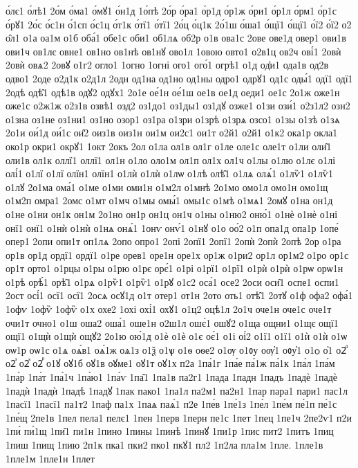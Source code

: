 {о́лє1
о́лѣ1
2о́м
о́ма1
о́мꙋ1
о́н1д
1о́пѣ
2о́р
о́ра1
о́р1д
о́р1ж
о́ри1
о́р1л
о́рм1
о́р1с
о́рꙋ1
2о́с
о́с1н
о́1сп
о́с1ц
о́т1к
о́тї1
о́тї1
2о́ц
о́ц1к
2о́1ш
о́ша1
о́щї1
о́щї1
о́ї2
о́ї2
о2̑
о̑л1
о1а
оа1м
о1б
оба́1
обе1с
оби1
об1лѧ
об2р
о1в
ова1с
2ове
ове1д
овер1
ови1в
ови1ч
ов1лє
овне1
ов1но
ов1нѣ
ов1нꙋ
ово1л
1овою
овто1
о2в1ц
ов2ч
ові́1
2овѝ
2овѝ
овѧ2
2овꙋ
о1г2
огло1
1огно
1огні
ого1
ого́1
огрѣ1
о1д
од̾и1
ода1в
од2в
одво1
2оде
о2д1к
о2д1л
2одн
од1на
од1но
од1ны
одро1
одрꙋ1
од1с
оды́1
одї1
одї1
2одѣ
одѣ̑1
одѣ1в
одꙋ2
одꙋх1
2о1е
ое́1н
ое́1ш
ое1в
ое1д
оеди1
ое1с
2о1ж
оже1н
оже1с
о2ж1ж
о2з1в
озвѣ1
озд2
оз1до1
оз1ды1
оз1дꙋ
озже1
о1зи
ози́1
о2з1л2
озн2
о1зна
оз1не
оз1ни1
оз1но
озор1
оз1ра
о1зри
о1зрѣ
о1зрѧ
озсо1
о1зы
о1зѣ
о1зѧ
2о1и
ои́1д
ои́1с
ои̑2
оиз1в
оиз1н
ои1м
ои2с1
ои1т
о2й1
о2й1
о1к2
ока1р
окла1
око1р
окри1
окрꙋ1
1окт
2окъ
2ол
о1ла
ол1в
ол1г
о1ле
оле1с
оле1т
о1ли
оли̑1
оли1в
ол1к
оллї1
оллї1
ол1н
о1ло
оло1м
ол1п
ол1х
ол1ч
о1лы
о1лю
о1лє
о1лі
олі́1
о1лї
о1лї
олїн1
олїн1
о1лѝ
о1лѝ
о1лѡ
о1лѣ
олѣ̑1
о1лѧ
олѧ́1
о1лѷ1
о1лѷ1
о1лꙋ
2о1ма
ома́1
о1ме
о1ми
оми1н
о1м2л
о1мнѣ
2о1мо
омо1л
омо1н
омо1щ
о1м2п
омра1
2омс
о1мт
о1мч
о1мы
омы́1
омы1с
о1мѣ
о1мѧ1
2омꙋ
о1на
он1д
о1не
о1ни
он1к
он1м
2о1но
он1р
он1ц
он1ч
о1ны
о1ню2
оню́1
о1нѐ
о1нѐ
о1ні
онї1
онї1
о1нѝ
о1нѝ
о1нѧ
онѧ́1
1онѵ
онѵ́1
о1нꙋ
о1о
оо́2
о1п
опа1д
опа1р
1опе́
опер1
2опи
опи1т
оп1лѧ
2опо
опро1
2опі
2опї1
2опї1
2опѝ
2опѝ
2опѣ
2ор
о1ра
ор1в
ор1д
ордї1
ордї1
о1ре
орев1
оре1н
оре1х
ор1ж
о1ри2
ор1л
ор1м2
о1ро
ор1с
ор1т
орто1
о1рцы
о1ры
о1рю
о1рє
орє́1
о1рі
о1рї1
о1рї1
о1рѝ
о1рѝ
о1рѡ
орѡ1н
о1рѣ
орѣ́1
орѣ̑1
о1рѧ
о1рѷ1
о1рѷ1
о1рꙋ
о1с2
оса́1
осе2
2оси
оси̑1
оспе1
оспи1
2ост
осі́1
осї1
осї1
2осѧ
осꙋ1д
о1т
отер1
от1н
2ото
оть1
отѣ̑1
2отꙋ
о1ф
офа2
офа́1
1офѵ
1офѷ
1офѷ
о1х
охе2
1охі
охі́1
охꙋ1
о1ц2
оцѣ1л
2о1ч
оче1н
оче1с
оче1т
очи1т
очно1
о1ш
оша2
оша́1
оше1н
о2ш1л
ошє́1
ошꙋ2
о1ща
ощни1
о1щє
ощї1
ощї1
о1щѝ
о1щѝ
ощꙋ2
2о1ю
ою́1д
о1ѐ
о1ѐ
о1є
оє́1
о1і
оі́2
о1ї1
о1ї1
о1ѝ
о1ѝ
о1ѡ
оѡ1р
оѡ1с
о1ѧ
оѧ́в1
оѧ́1ж
оѧ1з
о1ѯ
о1ѱ
о1ѳ
оѳе2
о1ѹ
о1ᲂу
оѹ҆1
оᲂу҆1
о1ѻ
о҆1
о2ⷣ
о2ⷥ
о2ⷦ
о2ⷬ
о1ꙋ
оꙋ1б
оꙋ1в
оꙋме1
оꙋ1т
оꙋ1х
п2а
1па́1г
1па́е
па́1ж
па́1к
1па́л
1па́м
1па́р
1па́т
1па́1ч
1па́ю1
1па́ѵ
1па̑1
1па1в
па2г1
1пада
1падн
1падъ
1падѐ
1падѐ
1падѝ
1падѝ
1падѣ
1падꙋ
1пак
пако1
1па1л
па2м1
па2н1
1пар
пара1
пари1
пас1л
1пасї1
1пасї1
па1т2
1паф
па1х
1паѧ
паѧ́1
п2е
1пе́в
1пе́1з
1пе́л
1пе́м
пе́1п
пе́1с
1пе́щ
2пе1в
1пел
пела1
пелє1
1пен
1перв
1перн
пе1с
1пет
1пец
1пе1ч
2пе2ѵ1
п2и
1пи́
пи́1щ
1пи̑1
пи1н
1пино
1пины
1пинѣ
1пинꙋ
1пи1р
1пис
пит2
1питъ
1пиц
1пиш
1пищ
1пию
2п1к
пка1
пки2
пко1
пкꙋ1
пл2
1п2ла
пла1м
1пле.
1пле1в
1пле1м
1пле1н
1плет
}
